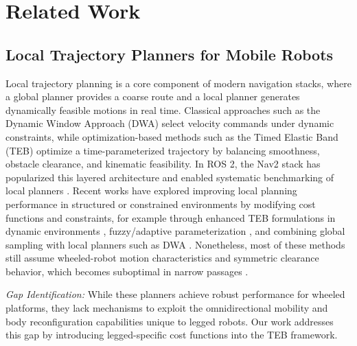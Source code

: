 \documentclass[lettersize,journal]{IEEEtran}
\begin{document}
\section{Related Work}

\subsection{Local Trajectory Planners for Mobile Robots}
Local trajectory planning is a core component of modern navigation stacks, where a global planner provides a coarse route and a local planner generates dynamically feasible motions in real time. Classical approaches such as the Dynamic Window Approach (DWA) \cite{foxDynamicWindowApproach1997} select velocity commands under dynamic constraints, while optimization-based methods such as the Timed Elastic Band (TEB) \cite{rosmannTrajectoryOptimizationUsing2017} optimize a time-parameterized trajectory by balancing smoothness, obstacle clearance, and kinematic feasibility. In ROS 2, the Nav2 stack has popularized this layered architecture and enabled systematic benchmarking of local planners \cite{macenskiROS2Navigation2020, macenskiMarathon2Navigation2020, macenskiBenchmarkingLocalPlanners2024}. Recent works have explored improving local planning performance in structured or constrained environments by modifying cost functions and constraints, for example through enhanced TEB formulations in dynamic environments \cite{sun_improved_2022}, fuzzy/adaptive parameterization \cite{zheng_fuzzy_2023}, and combining global sampling with local planners such as DWA \cite{suDynamicPathPlanning2025, huPathPlanningFramework2025}. Nonetheless, most of these methods still assume wheeled-robot motion characteristics and symmetric clearance behavior, which becomes suboptimal in narrow passages \cite{chenOptimizationbasedNavigationMobile2018, liuAsymmetricObstacleAvoidance2021}.

\textit{Gap Identification:} While these planners achieve robust performance for wheeled platforms, they lack mechanisms to exploit the omnidirectional mobility and body reconfiguration capabilities unique to legged robots. Our work addresses this gap by introducing legged-specific cost functions into the TEB framework.
\end{document}
